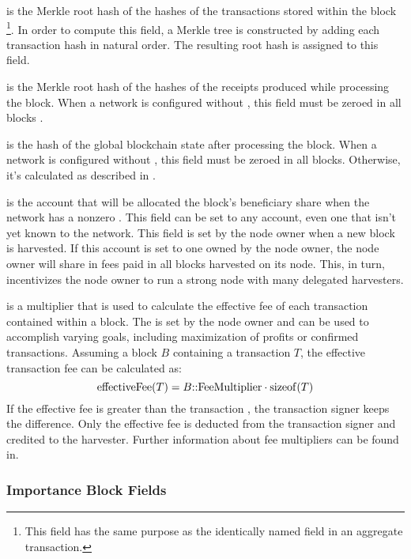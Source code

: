  is the Merkle root hash of the hashes of the transactions stored within the block
\footnote{This field has the same purpose as the identically named field in an aggregate transaction.}.
In order to compute this field, a Merkle tree is constructed by adding each transaction hash in natural order.
The resulting root hash is assigned to this field.

 is the Merkle root hash of the hashes of the receipts produced while processing the block.
When a network is configured without , this field must be zeroed in all blocks .

 is the hash of the global blockchain state after processing the block.
When a network is configured without , this field must be zeroed in all blocks.
Otherwise, it's calculated as described in .

 is the account that will be allocated the block's beneficiary share when the network has a nonzero .
This field can be set to any account, even one that isn't yet known to the network.
This field is set by the node owner when a new block is harvested.
If this account is set to one owned by the node owner, the node owner will share in fees paid in all blocks harvested on its node.
This, in turn, incentivizes the node owner to run a strong node with many delegated harvesters.

 is a multiplier that is used to calculate the effective fee of each transaction contained within a block.
The  is set by the node owner and can be used to accomplish varying goals, including maximization of profits or confirmed transactions.
Assuming a block $B$ containing a transaction $T$, the effective transaction fee can be calculated as:
$$\mathrm{effectiveFee}(T) = B\mathrm{{::}FeeMultiplier} \cdot \mathrm{sizeof}(T)$$
If the effective fee is greater than the transaction , the transaction signer keeps the difference.
Only the effective fee is deducted from the transaction signer and credited to the harvester.
Further information about fee multipliers can be found in.

\subsubsection{Importance Block Fields}

